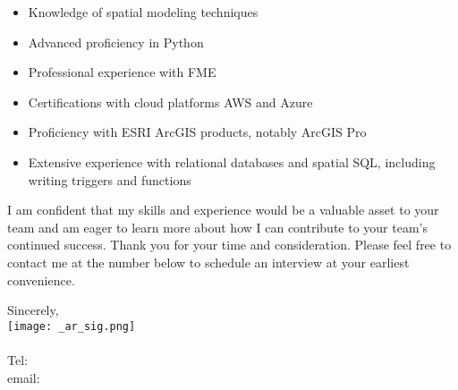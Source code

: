 \documentclass[letterpaper]{article}
\begin{document}
\vspace{-12pt}
\begin{itemize} \itemsep 0pt
\item Knowledge of spatial modeling techniques
\item Advanced proficiency in Python
\item Professional experience with FME
\item Certifications with cloud platforms AWS and Azure
\item Proficiency with ESRI ArcGIS products, notably ArcGIS Pro
\item Extensive experience with relational databases and spatial SQL, including writing triggers and functions
\end{itemize}

I am confident that my skills and experience would be a valuable asset to your team and
am eager to learn more about how I can contribute to your team's continued success.
Thank you for your time and consideration.
Please feel free to contact me at the number below to schedule an interview at your earliest convenience.

Sincerely,\\
    \hspace{1em}
    \texttt{[image: \_ar\_sig.png]} \\
    \CVsigname \\
    \small
    Tel: \CVphone \\
    email: \CVemail
\end{document}
